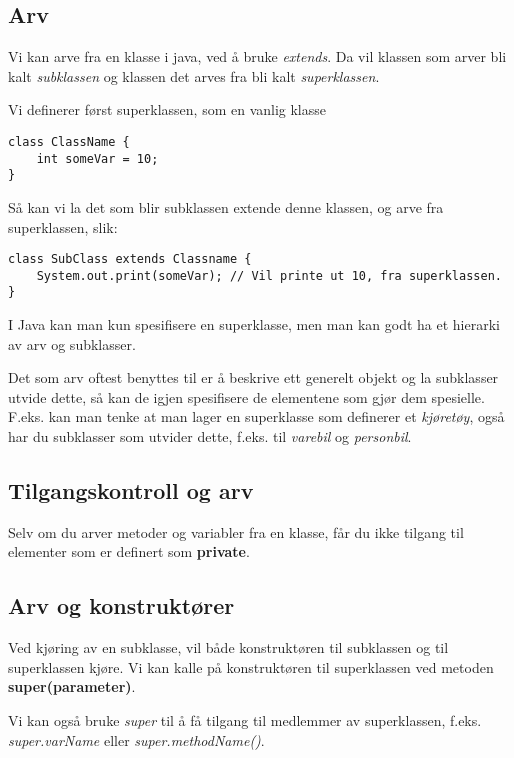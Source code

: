 \documentclass[11pt]{article}
\begin{document}
\subsection{Arv}
\label{sec-15-1}

Vi kan arve fra en klasse i java, ved å bruke \emph{extends}. Da vil
klassen som arver bli kalt \emph{subklassen} og klassen det arves fra bli
kalt \emph{superklassen}.

Vi definerer først superklassen, som en vanlig klasse


\begin{verbatim}
class ClassName {
    int someVar = 10;
}
\end{verbatim}

Så kan vi la det som blir subklassen extende denne klassen, og arve
fra superklassen, slik:


\begin{verbatim}
class SubClass extends Classname {
    System.out.print(someVar); // Vil printe ut 10, fra superklassen.
}
\end{verbatim}

I Java kan man kun spesifisere en superklasse, men man kan godt ha et
hierarki av arv og subklasser.

Det som arv oftest benyttes til er å beskrive ett generelt objekt og
la subklasser utvide dette, så kan de igjen spesifisere de elementene
som gjør dem spesielle. F.eks. kan man tenke at man lager en
superklasse som definerer et \emph{kjøretøy}, også har du subklasser som
utvider dette, f.eks. til \emph{varebil} og \emph{personbil}.
\subsection{Tilgangskontroll og arv}
\label{sec-15-2}


Selv om du arver metoder og variabler fra en klasse, får du ikke
tilgang til elementer som er definert som \textbf{private}.
\subsection{Arv og konstruktører}
\label{sec-15-3}


Ved kjøring av en subklasse, vil både konstruktøren til subklassen og
til superklassen kjøre. Vi kan kalle på konstruktøren til superklassen
ved metoden \textbf{super(parameter)}.

Vi kan også bruke \emph{super} til å få tilgang til medlemmer av
superklassen, f.eks. \emph{super.varName} eller \emph{super.methodName()}.
\end{document}
